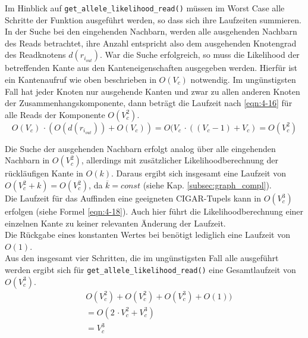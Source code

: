 Im Hinblick auf \lstinline|get_allele_likelihood_read()| müssen im Worst Case alle Schritte der Funktion ausgeführt werden, so dass sich ihre Laufzeiten summieren. In der Suche bei den eingehenden Nachbarn, werden alle ausgehenden Nachbarn des Reads betrachtet, ihre Anzahl entspricht also dem ausgehenden Knotengrad des Readknotens $d(r_{i_{out}})$. War die Suche erfolgreich, so muss die Likelihood der betreffenden Kante aus den Kanteneigenschaften ausgegeben werden. Hierfür ist ein Kantenaufruf wie oben beschrieben in $ O(V_{c}) $ notwendig. Im ungünstigsten Fall hat jeder Knoten nur ausgehende Kanten und zwar zu allen anderen Knoten der Zusammenhangskomponente, dann beträgt die Laufzeit nach \eqref{eqn:4-16} für alle Reads der Komponente $ O(V_{c}^2)$.
\begin{equation} \label{eqn:4-16}
\tag{4-16}
O(V_{c}) \, \cdotp (O(d(r_{i_{out}})) +  O(V_{c})) = O(V_{c} \, \cdotp ((V_{c}-1) + V_{c})  = O(V_{c}^2)
\end{equation} 

Die Suche der ausgehenden Nachbarn erfolgt analog über alle eingehenden Nachbarn in $ O(V_{c}^2)$, allerdings mit zusätzlicher Likelihoodberechnung der rückläufigen Kante in $O(k)$. Daraus ergibt sich insgesamt eine Laufzeit von $ O(V_{c}^2 +k) = O(V_{c}^2)$, da $\overline{k}=const$ (siehe Kap. \ref{subsec:graph_compl}).\\

Die Laufzeit für das Auffinden eine geeigneten CIGAR-Tupels kann in $O(V_{c}^3)$ erfolgen (siehe Formel \eqref{eqn:4-18}). Auch hier führt die Likelihoodberechnung einer einzelnen Kante zu keiner relevanten Änderung der Laufzeit.\\

Die Rückgabe eines konstanten Wertes bei benötigt lediglich eine Laufzeit von $ O(1) $.\\

Aus den insgesamt vier Schritten, die im ungünstigsten Fall alle ausgeführt werden ergibt sich für \lstinline|get_allele_likelihood_read()| eine Gesamtlaufzeit von $O(V_{c}^3)$. \\
\begin{equation} \label{eqn:4-17}
\tag{4-17}
\begin{aligned}
&\ {} O(V_{c}^2) + O(V_{c}^2) + O(V_{c}^3) + O(1))  \\
& \ = O(2 \, \cdotp V_{c}^2 + V_{c}^3 )\\
&\ = V_{c}^3\\
\end{aligned}
\end{equation}

